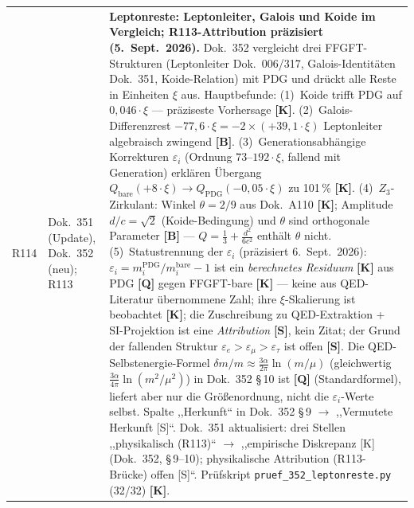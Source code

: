 \begin{longtable}{@{}p{0.9cm}p{3.1cm}p{10.2cm}@{}}
R114 & Dok.~351 (Update), Dok.~352 (neu); R113 & \textbf{Leptonreste: Leptonleiter, Galois und Koide im Vergleich; R113-Attribution präzisiert \QM{} (5.~Sept.~2026).} Dok.~352 vergleicht drei FFGFT-Strukturen (Leptonleiter Dok.~006/317, Galois-Identitäten Dok.~351, Koide-Relation) mit PDG und drückt alle Reste in Einheiten $\xi$ aus. Hauptbefunde: (1)~Koide trifft PDG auf $0{,}046\cdot\xi$ --- präziseste Vorhersage \textbf{[K]}. (2)~Galois-Differenzrest $-77{,}6\cdot\xi = -2\times(+39{,}1\cdot\xi)$ Leptonleiter algebraisch zwingend \textbf{[B]}. (3)~Generationsabhängige Korrekturen $\varepsilon_i$ (Ordnung $73$--$192\cdot\xi$, fallend mit Generation) erklären Übergang $Q_{\mathrm{bare}}(+8\cdot\xi)\to Q_{\mathrm{PDG}}(-0{,}05\cdot\xi)$ zu 101\,\% \textbf{[K]}. (4)~$Z_3$-Zirkulant: Winkel $\theta=2/9$ aus Dok.~A110 \textbf{[K]}; Amplitude $d/c=\sqrt{2}$ (Koide-Bedingung) und $\theta$ sind orthogonale Parameter \textbf{[B]} --- $Q=\tfrac{1}{3}+\tfrac{d^2}{6c^2}$ enthält $\theta$ nicht. (5)~Statustrennung der $\varepsilon_i$ (präzisiert 6.~Sept.~2026): $\varepsilon_i = m_i^{\mathrm{PDG}}/m_i^{\mathrm{bare}} - 1$ ist ein \emph{berechnetes Residuum} \textbf{[K]} aus PDG \textbf{[Q]} gegen FFGFT-bare \textbf{[K]} --- keine aus QED-Literatur übernommene Zahl; ihre $\xi$-Skalierung ist beobachtet \textbf{[K]}; die Zuschreibung zu QED-Extraktion + SI-Projektion ist eine \emph{Attribution} \textbf{[S]}, kein Zitat; der Grund der fallenden Struktur $\varepsilon_e>\varepsilon_\mu>\varepsilon_\tau$ ist offen \textbf{[S]}. Die QED-Selbstenergie-Formel $\delta m/m\approx\tfrac{3\alpha}{2\pi}\ln(m/\mu)$ (gleichwertig $\tfrac{3\alpha}{4\pi}\ln(m^2/\mu^2)$) in Dok.~352 §\,10 ist \textbf{[Q]} (Standardformel), liefert aber nur die Größenordnung, nicht die $\varepsilon_i$-Werte selbst. Spalte ,,Herkunft`` in Dok.~352 §\,9 $\to$ ,,Vermutete Herkunft [S]``. Dok.~351 aktualisiert: drei Stellen ,,physikalisch (R113)`` $\to$ ,,empirische Diskrepanz [K] (Dok.~352, §\,9--10); physikalische Attribution (R113-Brücke) offen [S]``. Prüfskript \texttt{pruef\_352\_leptonreste.py} (32/32) \textbf{[K]}. \\

\end{longtable}
